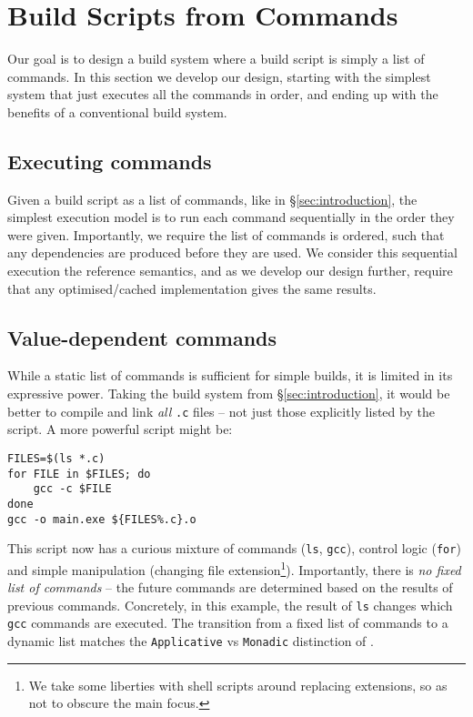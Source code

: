 \section{Build Scripts from Commands}
\label{sec:design}

Our goal is to design a build system where a build script is simply a list of commands. In this section we develop our design, starting with the simplest system that just executes all the commands in order, and ending up with the benefits of a conventional build system.

\subsection{Executing commands}
\label{sec:executing_commands}

Given a build script as a list of commands, like in \S\ref{sec:introduction}, the simplest execution model is to run each command sequentially in the order they were given. Importantly, we require the list of commands is ordered, such that any dependencies are produced before they are used. We consider this sequential execution the reference semantics, and as we develop our design further, require that any optimised/cached implementation gives the same results.

\subsection{Value-dependent commands}
\label{sec:monadic}

While a static list of commands is sufficient for simple builds, it is limited in its expressive power. Taking the build system from \S\ref{sec:introduction}, it would be better to compile and link \emph{all} \texttt{.c} files -- not just those explicitly listed by the script. A more powerful script might be:

\vspace{3mm}
\begin{verbatim}
FILES=$(ls *.c)
for FILE in $FILES; do
    gcc -c $FILE
done
gcc -o main.exe ${FILES%.c}.o
\end{verbatim}
\vspace{3mm}

This script now has a curious mixture of commands (\texttt{ls}, \texttt{gcc}), control logic (\texttt{for}) and simple manipulation (changing file extension\footnote{We take some liberties with shell scripts around replacing extensions, so as not to obscure the main focus.}). Importantly, there is \emph{no fixed list of commands} -- the future commands are determined based on the results of previous commands. Concretely, in this example, the result of \texttt{ls} changes which \texttt{gcc} commands are executed. The transition from a fixed list of commands to a dynamic list matches the \texttt{Applicative} vs \texttt{Monadic} distinction of \citet[\S3.5]{build_systems_a_la_carte}.

